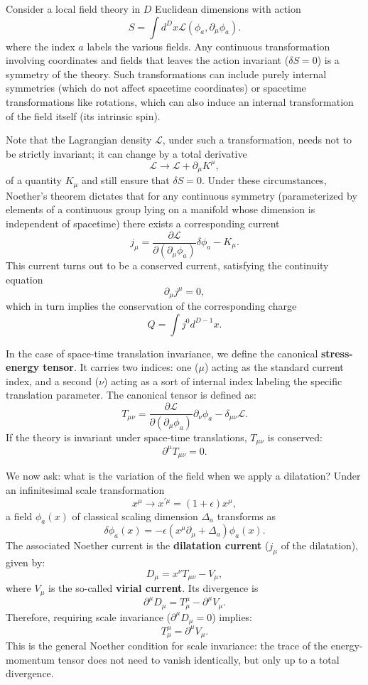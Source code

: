 Consider a local field theory in \(D\) Euclidean dimensions with action
\[
    S=\int d^{D}x\mathcal{L}(\phi_{a},\partial_{\mu}\phi_{a}).
\]
where the index \(a\) labels the various fields. Any continuous transformation involving coordinates and fields that leaves the action invariant (\(\delta S=0\)) is a symmetry of the theory. Such transformations can include purely internal symmetries (which do not affect spacetime coordinates) or spacetime transformations like rotations, which can also induce an internal transformation of the field itself (its intrinsic spin).

Note that the Lagrangian density \(\mathcal{L}\), under such a transformation, needs not to be strictly invariant; it can change by a total derivative
\[
    \mathcal{L}\rightarrow\mathcal{L}+\partial_{\mu}K^{\mu},
\]
of a quantity \(K_{\mu}\) and still ensure that \(\delta S=0\). Under these circumstances, Noether's theorem dictates that for any continuous symmetry (parameterized by elements of a continuous group lying on a manifold whose dimension is independent of spacetime) there exists a corresponding current
\[
    j_{\mu}=\frac{\partial\mathcal{L}}{\partial(\partial_{\mu}\phi_{a})}\delta\phi_{a}-K_{\mu}.
\]
This current turns out to be a conserved current, satisfying the continuity equation
\[
    \partial_{\mu}j^{\mu}=0,
\]
which in turn implies the conservation of the corresponding charge
\[
    Q=\int j^{0}d^{D-1}x.
\]

In the case of space-time translation invariance, we define the canonical \textbf{stress-energy tensor}. It carries two indices: one (\(\mu\)) acting as the standard current index, and a second (\(\nu\)) acting as a sort of internal index labeling the specific translation parameter. The canonical tensor is defined as:
\[
    T_{\mu\nu}=\frac{\partial\mathcal{L}}{\partial(\partial_{\mu}\phi_{a})}\partial_{\nu}\phi_{a}-\delta_{\mu\nu}\mathcal{L}.
\]
If the theory is invariant under space-time translations, \(T_{\mu\nu}\) is conserved:
\[
    \partial^{\mu}T_{\mu\nu}=0.
\]

We now ask: what is the variation of the field when we apply a dilatation? Under an infinitesimal scale transformation
\[
    x^{\mu}\rightarrow x^{\prime\mu}=(1+\epsilon)x^{\mu},
\]
a field \(\phi_{a}(x)\) of classical scaling dimension \(\Delta_{a}\) transforms as
\[
    \delta\phi_{a}(x)=-\epsilon(x^{\mu}\partial_{\mu}+\Delta_{a})\phi_{a}(x).
\]
The associated Noether current is the \textbf{dilatation current} (\(j_{\mu}\) of the dilatation), given by:
\[
    D_{\mu}=x^{\nu}T_{\mu\nu}-V_{\mu},
\]
where \(V_{\mu}\) is the so-called \textbf{virial current}. Its divergence is
\[
    \partial^{\mu}D_{\mu}=T_{\mu}^{\mu}-\partial^{\mu}V_{\mu}.
\]
Therefore, requiring scale invariance (\(\partial^{\mu}D_{\mu} = 0\)) implies:
\begin{equation}
    T_{\mu}^{\mu}=\partial^{\mu}V_{\mu}.
    \label{eq:trace_virial}
\end{equation}
This is the general Noether condition for scale invariance: the trace of the energy-momentum tensor does not need to vanish identically, but only up to a total divergence.

